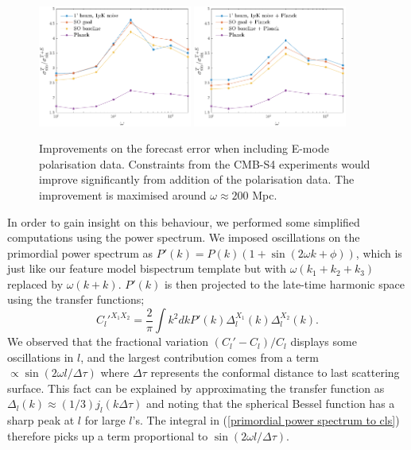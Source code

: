 \begin{figure}[ht]
	\centering
	\includegraphics[width=0.45\textwidth]{improvement_ratio.pdf}
	\includegraphics[width=0.45\textwidth]{improvement_ratio_combined.pdf}
	\caption{Improvements on the forecast error when including E-mode polarisation data. Constraints from the CMB-S4 experiments would improve significantly from addition of the polarisation data. The improvement is maximised around $\omega\approx200$ Mpc.}
	\label{forecast improvement ratio}
\end{figure}

In order to gain insight on this behaviour, we performed some simplified computations using the power spectrum. We imposed oscillations on the primordial power spectrum as $P'(k) = P(k)(1+\sin(2\omega k + \phi))$, which is just like our feature model bispectrum template but with $\omega(k_1+k_2+k_3)$ replaced by $\omega(k+k)$. $P'(k)$ is then projected to the late-time harmonic space using the transfer functions;
\begin{equation}
	C_l'^{X_1 X_2} = \frac{2}{\pi} \int k^2 dk P'(k) \Delta_l^{X_1}(k) \Delta_l^{X_2}(k).
	\label{primordial power spectrum to cls}
\end{equation}
We observed that the fractional variation $(C_l'-C_l)/C_l$ displays some oscillations in $l$, and the largest contribution comes from a term $\propto \sin(2\omega l/\Delta\tau)$ where $\Delta\tau$ represents the conformal distance to last scattering surface. This fact can be explained by approximating the transfer function as $\Delta_l(k)\approx (1/3)j_l(k\Delta\tau)$ and noting that the spherical Bessel function has a sharp peak at $l$ for large $l$'s. The integral in (\ref{primordial power spectrum to cls}) therefore picks up a term proportional to $\sin(2\omega l/\Delta\tau)$.

